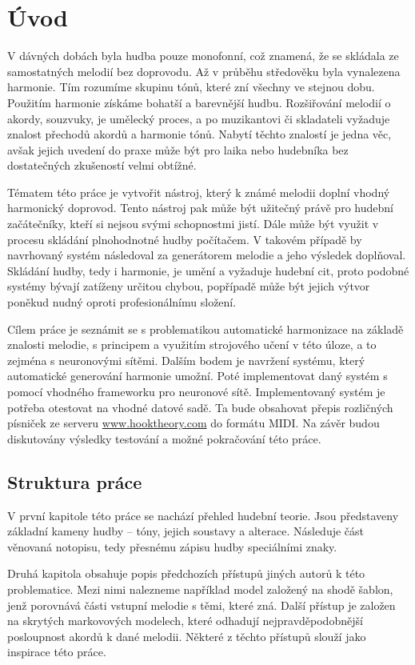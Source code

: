 \chapter{Úvod}
\label{uvod}

V dávných dobách byla hudba pouze monofonní, což znamená, 
že se skládala ze samostatných melodií bez doprovodu.
Až v průběhu středověku byla vynalezena harmonie.
Tím rozumíme skupinu tónů, které zní všechny ve stejnou dobu.
Použitím harmonie získáme bohatší a barevnější hudbu.
Rozšiřování melodií o akordy, souzvuky, je umělecký proces,
a po muzikantovi či skladateli vyžaduje znalost přechodů akordů a harmonie tónů.
Nabytí těchto znalostí je jedna věc, 
avšak jejich uvedení do praxe může být pro laika 
nebo hudebníka bez dostatečných zkušeností velmi obtížné.
\par

Tématem této práce je vytvořit nástroj, 
který k známé melodii doplní vhodný harmonický doprovod.
Tento nástroj pak může být užitečný právě pro hudební začátečníky,
kteří si nejsou svými schopnostmi jistí. 
Dále může být využit v procesu skládání plnohodnotné hudby počítačem.
V takovém případě by navrhovaný systém následoval za generátorem melodie
a jeho výsledek doplňoval.
Skládání hudby, tedy i harmonie, je umění a vyžaduje hudební cit,
proto podobné systémy bývají zatíženy určitou chybou, 
popřípadě může být jejich výtvor poněkud nudný oproti profesionálnímu složení.
\par

Cílem práce je seznámit se s problematikou automatické harmonizace na základě znalosti melodie,
s principem a využitím strojového učení v této úloze, a to zejména s neuronovými sítěmi.
Dalším bodem je navržení systému, který automatické generování harmonie umožní.
Poté implementovat daný systém s pomocí vhodného frameworku pro neuronové sítě.
Implementovaný systém je potřeba otestovat na vhodné datové sadě. 
Ta bude obsahovat přepis rozličných písniček ze serveru \url{www.hooktheory.com}
do formátu MIDI.
Na závěr budou diskutovány výsledky testování a možné pokračování této práce.

\section{Struktura práce}
V první kapitole této práce se nachází přehled hudební teorie.
Jsou představeny základní kameny hudby -- tóny, jejich soustavy a alterace.
Následuje část věnovaná notopisu,
tedy přesnému zápisu hudby speciálními znaky.
\par
Druhá kapitola obsahuje popis předchozích přístupů jiných autorů k této problematice.
Mezi nimi nalezneme například model založený na shodě šablon, 
jenž porovnává části vstupní melodie s těmi, které zná.
Další přístup je založen na skrytých markovových modelech, 
které odhadují nejpravděpodobnější posloupnost akordů k dané melodii.
Některé z těchto přístupů slouží jako inspirace této práce.
\par

